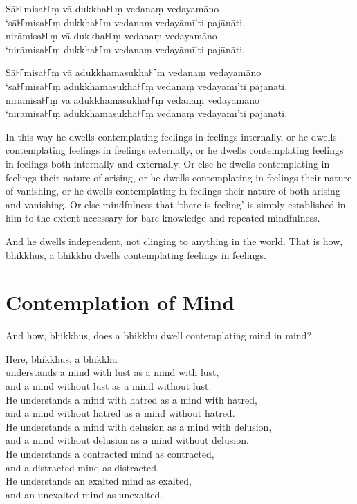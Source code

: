 Sā꜔꜒misa꜔꜒ṃ vā dukkha꜔꜒ṃ vedanaṃ vedayamāno\\
‘sā꜔꜒misa꜔꜒ṃ dukkha꜔꜒ṃ vedanaṃ vedayāmī’ti pajānāti.\\
nirāmisa꜔꜒ṃ vā dukkha꜔꜒ṃ vedanaṃ vedayamāno\\
‘nirāmisa꜔꜒ṃ dukkha꜔꜒ṃ vedanaṃ vedayāmī’ti pajānāti.

Sā꜔꜒misa꜔꜒ṃ vā adukkhamasukha꜔꜒ṃ vedanaṃ vedayamāno\\
‘sā꜔꜒misa꜔꜒ṃ adukkhamasukha꜔꜒ṃ vedanaṃ vedayāmī’ti pajānāti.\\
nirāmisa꜔꜒ṃ vā adukkhamasukha꜔꜒ṃ vedanaṃ vedayamāno\\
‘nirāmisa꜔꜒ṃ adukkhamasukha꜔꜒ṃ vedanaṃ vedayāmī’ti pajānāti.

\englishPage

In this way he dwells contemplating feelings in feelings internally, or he
dwells contemplating feelings in feelings externally, or he dwells contemplating
feelings in feelings both internally and externally. Or else he dwells
contemplating in feelings their nature of arising, or he dwells contemplating in
feelings their nature of vanishing, or he dwells contemplating in feelings their
nature of both arising and vanishing. Or else mindfulness that ‘there is
feeling’ is simply established in him to the extent necessary for bare knowledge
and repeated mindfulness.

And he dwells independent, not clinging to anything in the world. That is how,
bhikkhus, a bhikkhu dwells contemplating feelings in feelings.


\chapter{Contemplation of Mind}

And how, bhikkhus, does a bhikkhu dwell contemplating mind in mind?

Here, bhikkhus, a bhikkhu\\
understands a mind with lust as a mind with lust,\\
and a mind without lust as a mind without lust.\\
He understands a mind with hatred as a mind with hatred,\\
and a mind without hatred as a mind without hatred.\\
He understands a mind with delusion as a mind with delusion,\\
and a mind without delusion as a mind without delusion.\\
He understands a contracted mind as contracted,\\
and a distracted mind as distracted.\\
He understands an exalted mind as exalted,\\
and an unexalted mind as unexalted.

